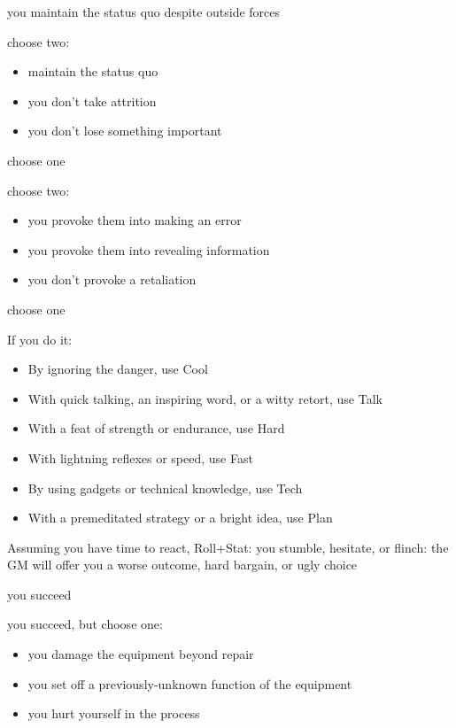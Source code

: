 {you maintain the status quo despite outside forces}
{choose two:
\begin{itemize}
\item maintain the status quo
\item you don't take attrition
\item you don't lose something important
\end{itemize}}
{choose one}

{choose two:
\begin{itemize}
\item you provoke them into making an error
\item you provoke them into revealing information
\item you don't provoke a retaliation
\end{itemize}}
{choose one}

If you do it:
\begin{itemize}
\item By ignoring the danger, use Cool
\item With quick talking, an inspiring word, or a witty retort, use Talk
\item With a feat of strength or endurance, use Hard
\item With lightning reflexes or speed, use Fast
\item By using gadgets or technical knowledge, use Tech
\item With a premeditated strategy or a bright idea, use Plan
\end{itemize}
Assuming you have time to react, Roll+Stat:
{you stumble, hesitate, or flinch: the GM will offer you a worse outcome, hard bargain, or ugly choice}

{you succeed}
{you succeed, but choose one:
\begin{itemize}
\item you damage the equipment beyond repair
\item you set off a previously-unknown function of the equipment
\item you hurt yourself in the process
\end{itemize}}

